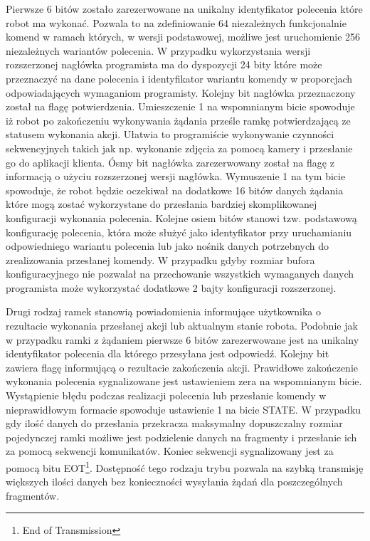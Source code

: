 Pierwsze 6 bitów zostało zarezerwowane na unikalny identyfikator polecenia które
robot ma wykonać. Pozwala to na zdefiniowanie 64 niezależnych funkcjonalnie
komend w ramach których, w wersji podstawowej, możliwe jest uruchomienie 256
niezależnych wariantów polecenia. W przypadku wykorzystania wersji rozszerzonej
nagłówka programista ma do dyspozycji 24 bity które może przeznaczyć na dane
polecenia i identyfikator wariantu komendy w proporcjach odpowiadających
wymaganiom programisty. Kolejny bit nagłówka przeznaczony został na flagę potwierdzenia.
Umieszczenie 1 na wspomnianym bicie spowoduje iż robot po zakończeniu
wykonywania żądania prześle ramkę potwierdzającą ze statusem wykonania akcji.
Ułatwia to programiście wykonywanie czynności sekwencyjnych takich jak np. wykonanie
zdjęcia za pomocą kamery i przesłanie go do aplikacji klienta. Ósmy bit nagłówka
zarezerwowany został na flagę z informacją o użyciu rozszerzonej wersji
nagłówka. Wymuszenie 1 na tym bicie spowoduje, że robot będzie oczekiwał na
dodatkowe 16 bitów danych żądania które mogą zostać wykorzystane do przesłania
bardziej skomplikowanej konfiguracji wykonania polecenia. Kolejne osiem bitów
stanowi tzw. podstawową konfigurację polecenia, która może służyć jako
identyfikator przy uruchamianiu odpowiedniego wariantu polecenia lub jako nośnik
danych potrzebnych do zrealizowania przesłanej komendy. W przypadku gdyby
rozmiar bufora konfiguracyjnego nie pozwalał na przechowanie wszystkich
wymaganych danych programista może wykorzystać dodatkowe 2 bajty konfiguracji
rozszerzonej.

Drugi rodzaj ramek stanowią powiadomienia informujące użytkownika o rezultacie 
wykonania przesłanej akcji lub aktualnym stanie robota. Podobnie jak w przypadku
ramki z żądaniem pierwsze 6 bitów zarezerwowane jest na unikalny identyfikator
polecenia dla którego przesyłana jest odpowiedź. Kolejny bit zawiera flagę
informującą o rezultacie zakończenia akcji. Prawidłowe zakończenie wykonania
polecenia sygnalizowane jest ustawieniem zera na wspomnianym bicie. Wystąpienie
błędu podczas realizacji polecenia lub przesłanie komendy w nieprawidłowym
formacie spowoduje ustawienie 1 na bicie STATE. W przypadku gdy ilość
danych do przesłania przekracza maksymalny dopuszczalny rozmiar
pojedynczej ramki możliwe jest podzielenie danych na fragmenty i przesłanie ich
za pomocą sekwencji komunikatów. Koniec sekwencji sygnalizowany jest za pomocą
bitu EOT\footnote{End of Transmission}. Dostępność tego rodzaju trybu pozwala
na szybką transmisję większych ilości danych bez konieczności wysyłania żądań dla poszczególnych fragmentów.

